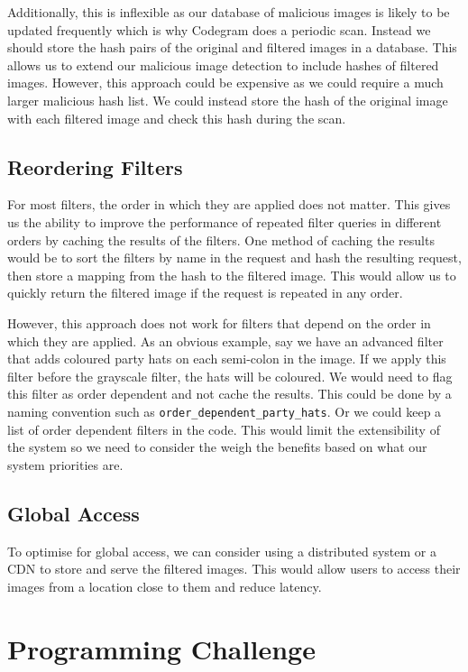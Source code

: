 \documentclass{csse4400}
\begin{document}
Additionally, this is inflexible as our database of malicious images is likely to be updated frequently which is why Codegram does a periodic scan.
Instead we should store the hash pairs of the original and filtered images in a database.
This allows us to extend our malicious image detection to include hashes of filtered images.
However, this approach could be expensive as we could require a much larger malicious hash list.
We could instead store the hash of the original image with each filtered image and check this hash during the scan.

\subsection{Reordering Filters}
For most filters, the order in which they are applied does not matter.
This gives us the ability to improve the performance of repeated filter queries in different orders by caching the results of the filters.
One method of caching the results would be to sort the filters by name in the request and hash the resulting request,
then store a mapping from the hash to the filtered image.
This would allow us to quickly return the filtered image if the request is repeated in any order.

However, this approach does not work for filters that depend on the order in which they are applied.
As an obvious example, say we have an advanced filter that adds coloured party hats on each semi-colon in the image.
If we apply this filter before the grayscale filter, the hats will be coloured.
We would need to flag this filter as order dependent and not cache the results.
This could be done by a naming convention such as \texttt{order\_dependent\_party\_hats}.
Or we could keep a list of order dependent filters in the code.
This would limit the extensibility of the system so we need to consider the weigh the benefits based on what our system priorities are.


\subsection{Global Access}
To optimise for global access,
we can consider using a distributed system or a CDN to store and serve the filtered images.
This would allow users to access their images from a location close to them and reduce latency.

\section{Programming Challenge}
\end{document}
